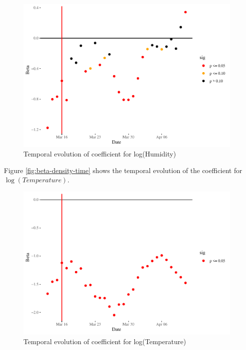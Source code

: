 \documentclass[]{elsarticle} %
\makeatletter
\def\maxwidth{\ifdim\Gin@nat@width>\linewidth\linewidth
\else\Gin@nat@width\fi}
\let\Oldincludegraphics\includegraphics
\renewcommand{\includegraphics}[1]{\Oldincludegraphics[width=\maxwidth]{#1}}
\makeatother
\begin{document}
\begin{figure}
\centering
\includegraphics{Environmental-Correlates-of-COVID19-Spain_files/figure-latex/beta-humidity-time-1.pdf}
\caption{\label{fig:beta-humidity-time}Temporal evolution of coefficient
for log(Humidity)}
\end{figure}

Figure \ref{fig:beta-density-time} shows the temporal evolution of the
coefficient for \(\log(Temperature)\).

\begin{figure}
\centering
\includegraphics{Environmental-Correlates-of-COVID19-Spain_files/figure-latex/beta-temperature-time-1.pdf}
\caption{\label{fig:beta-temperature-time}Temporal evolution of
coefficient for log(Temperature)}
\end{figure}
\end{document}
